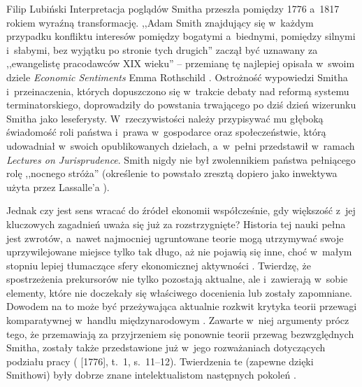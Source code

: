 \begin{artplenv}{Filip Lubiński}
Interpretacja poglądów Smitha przeszła pomiędzy 1776 a~1817 rokiem wyraźną transformację. ,,Adam Smith znajdujący
się w~każdym przypadku konfliktu interesów pomiędzy bogatymi a~biednymi, pomiędzy silnymi i~słabymi, bez wyjątku po
stronie tych drugich''
\parencite[s.~223]{menger_kleinere_1935}
zaczął być uznawany za ,,ewangelistę pracodawców
XIX wieku'' -- przemianę tę najlepiej opisała w~swoim dziele \textit{Economic Sentiments} Emma Rothschild
\parencite[s.~113]{rothschild_economic_2002}.
Ostrożność wypowiedzi Smitha i~przeinaczenia, których dopuszczono
się w~trakcie debaty nad reformą systemu terminatorskiego, doprowadziły do powstania trwającego po dziś dzień wizerunku
Smitha jako leseferysty. W~rzeczywistości należy przypisywać mu głęboką świadomość roli państwa i~prawa w~gospodarce
oraz społeczeństwie, którą udowadniał w~swoich opublikowanych dziełach, a~w~pełni przedstawił w~ramach \textit{Lectures
on Jurisprudence}. Smith nigdy nie był zwolennikiem państwa pełniącego rolę ,,nocnego stróża'' (określenie to powstało
zresztą dopiero jako inwektywa użyta przez Lassalle'a
\parencite[s.~87]{sawer_ethical_2003}).

Jednak czy jest sens wracać do źródeł ekonomii współcześnie, gdy większość z~jej kluczowych zagadnień uważa się już
za rozstrzygnięte? Historia tej nauki pełna jest zwrotów, a~nawet najmocniej ugruntowane teorie mogą utrzymywać swoje
uprzywilejowane miejsce tylko tak długo, aż nie pojawią się inne, choć w~małym stopniu lepiej tłumaczące sfery
ekonomicznej aktywności
\parencite[s.~33]{blaug_teoria_1994}.
Twierdzę, że spostrzeżenia prekursorów nie tylko
pozostają aktualne, ale i~zawierają w~sobie elementy, które nie doczekały się właściwego docenienia lub zostały
zapomniane. Dowodem na to może być przeżywająca aktualnie rozkwit krytyka teorii przewagi komparatywnej w~handlu
międzynarodowym
\parencite{reinert_how_2008}.
Zawarte w~niej argumenty prócz tego, że przemawiają za
przyjrzeniem się ponownie teorii przewag bezwzględnych Smitha, zostały także przedstawione już w~jego rozważaniach
dotyczących podziału pracy
(\cite{smith_badania_2007} [1776], t.~1, s.~11--12).
Twierdzenia te (zapewne
dzięki Smithowi) były dobrze znane intelektualistom następnych pokoleń
\parencite[s.~343]{tolstoj_anna_1986}.


\end{artplenv}
